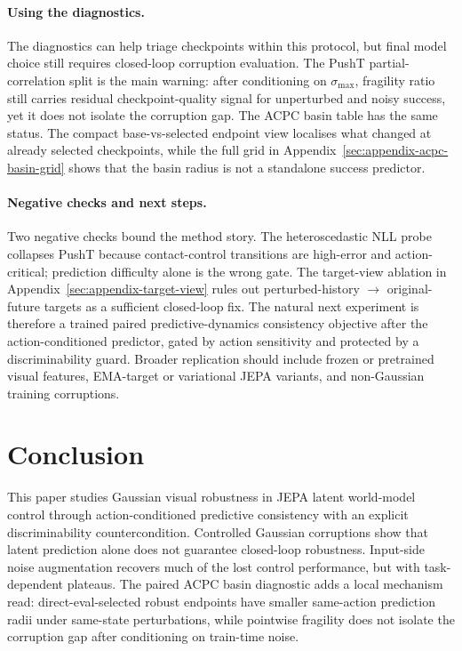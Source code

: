 \documentclass[10pt]{article}
\newcommand{\stdmax}{\ensuremath{\sigma_{\max}}}
\newcommand{\fragility}{fragility ratio}
\begin{document}
\paragraph{Using the diagnostics.}
The diagnostics can help triage checkpoints within this protocol, but final model choice still requires closed-loop corruption evaluation. The PushT partial-correlation split is the main warning: after conditioning on \stdmax{}, \fragility{} still carries residual checkpoint-quality signal for unperturbed and noisy success, yet it does not isolate the corruption gap. The ACPC basin table has the same status. The compact base-vs-selected endpoint view localises what changed at already selected checkpoints, while the full grid in Appendix~\ref{sec:appendix-acpc-basin-grid} shows that the basin radius is not a standalone success predictor.

\paragraph{Negative checks and next steps.}
Two negative checks bound the method story. The heteroscedastic NLL probe collapses PushT because contact-control transitions are high-error and action-critical; prediction difficulty alone is the wrong gate. The target-view ablation in Appendix~\ref{sec:appendix-target-view} rules out perturbed-history $\to$ original-future targets as a sufficient closed-loop fix. The natural next experiment is therefore a trained paired predictive-dynamics consistency objective after the action-conditioned predictor, gated by action sensitivity and protected by a discriminability guard. Broader replication should include frozen or pretrained visual features, EMA-target or variational JEPA variants, and non-Gaussian training corruptions.

\section{Conclusion}\label{sec:conc}

This paper studies Gaussian visual robustness in JEPA latent world-model control through action-conditioned predictive consistency with an explicit discriminability countercondition. Controlled Gaussian corruptions show that latent prediction alone does not guarantee closed-loop robustness. Input-side noise augmentation recovers much of the lost control performance, but with task-dependent plateaus. The paired ACPC basin diagnostic adds a local mechanism read: direct-eval-selected robust endpoints have smaller same-action prediction radii under same-state perturbations, while pointwise fragility does not isolate the corruption gap after conditioning on train-time noise.
\end{document}
